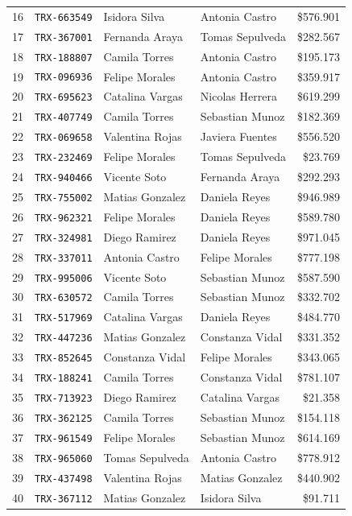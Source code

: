 \documentclass[letter,12pt]{article}
\begin{document}
{\begin{longtable}{@{}rlllr@{}}
16 & \texttt{TRX-663549} & Isidora Silva & Antonia Castro & \$576.901 \\
17 & \texttt{TRX-367001} & Fernanda Araya & Tomas Sepulveda & \$282.567 \\
18 & \texttt{TRX-188807} & Camila Torres & Antonia Castro & \$195.173 \\
19 & \texttt{TRX-096936} & Felipe Morales & Antonia Castro & \$359.917 \\
20 & \texttt{TRX-695623} & Catalina Vargas & Nicolas Herrera & \$619.299 \\
21 & \texttt{TRX-407749} & Camila Torres & Sebastian Munoz & \$182.369 \\
22 & \texttt{TRX-069658} & Valentina Rojas & Javiera Fuentes & \$556.520 \\
23 & \texttt{TRX-232469} & Felipe Morales & Tomas Sepulveda & \$23.769 \\
24 & \texttt{TRX-940466} & Vicente Soto & Fernanda Araya & \$292.293 \\
25 & \texttt{TRX-755002} & Matias Gonzalez & Daniela Reyes & \$946.989 \\
26 & \texttt{TRX-962321} & Felipe Morales & Daniela Reyes & \$589.780 \\
27 & \texttt{TRX-324981} & Diego Ramirez & Daniela Reyes & \$971.045 \\
28 & \texttt{TRX-337011} & Antonia Castro & Felipe Morales & \$777.198 \\
29 & \texttt{TRX-995006} & Vicente Soto & Sebastian Munoz & \$587.590 \\
30 & \texttt{TRX-630572} & Camila Torres & Sebastian Munoz & \$332.702 \\
31 & \texttt{TRX-517969} & Catalina Vargas & Daniela Reyes & \$484.770 \\
32 & \texttt{TRX-447236} & Matias Gonzalez & Constanza Vidal & \$331.352 \\
33 & \texttt{TRX-852645} & Constanza Vidal & Felipe Morales & \$343.065 \\
34 & \texttt{TRX-188241} & Camila Torres & Constanza Vidal & \$781.107 \\
35 & \texttt{TRX-713923} & Diego Ramirez & Catalina Vargas & \$21.358 \\
36 & \texttt{TRX-362125} & Camila Torres & Sebastian Munoz & \$154.118 \\
37 & \texttt{TRX-961549} & Felipe Morales & Sebastian Munoz & \$614.169 \\
38 & \texttt{TRX-965060} & Tomas Sepulveda & Antonia Castro & \$778.912 \\
39 & \texttt{TRX-437498} & Valentina Rojas & Matias Gonzalez & \$440.902 \\
40 & \texttt{TRX-367112} & Matias Gonzalez & Isidora Silva & \$91.711 \\
\end{longtable}
}
\end{document}
